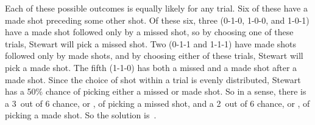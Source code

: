 \documentclass{article}
\begin{document}
Each of these possible outcomes is equally likely for any trial.
Six of these have a made shot preceding some other shot.
Of these six, three (0-1-0, 1-0-0, and 1-0-1) have a made shot followed only by a missed shot, so by choosing one of these trials, Stewart will pick a missed shot.
Two (0-1-1 and 1-1-1) have made shots followed only by made shots, and by choosing either of these trials, Stewart will pick a made shot.
The fifth (1-1-0) has both a missed and a made shot after a made shot.
Since the choice of shot within a trial is evenly distributed, Stewart has a 50\% chance of picking either a missed or made shot.
So in a sense, there is a 3\, out of 6 chance, or , of picking a missed shot, and a 2\, out of 6 chance, or , of picking a made shot.
So the solution is
\,.
\end{document}
